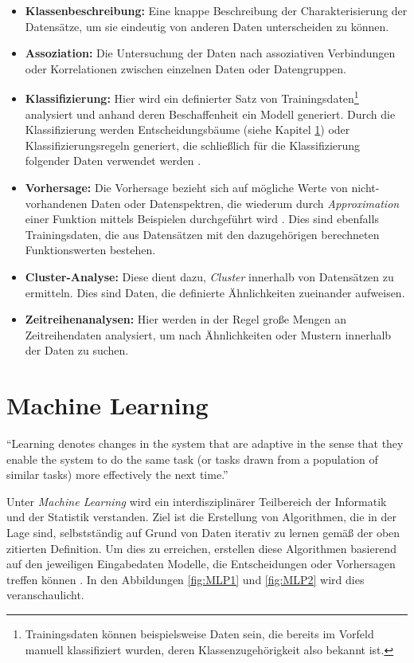\begin{itemize}
		\item \textbf{Klassenbeschreibung:} Eine knappe Beschreibung der Charakterisierung der Datensätze, um sie eindeutig von anderen Daten unterscheiden zu können. 
		\item \textbf{Assoziation:} Die Untersuchung der Daten nach assoziativen Verbindungen oder Korrelationen zwischen einzelnen Daten oder Datengruppen.   
		\item \textbf{Klassifizierung:} Hier wird ein definierter Satz von Trainingsdaten\footnote{Trainingsdaten können beispielsweise Daten sein, die bereits im Vorfeld manuell klassifiziert wurden, deren Klassenzugehörigkeit also bekannt ist.} analysiert und anhand deren Beschaffenheit ein Modell generiert. Durch die Klassifizierung werden Entscheidungsbäume (siehe Kapitel \ref{section:machine learning}) oder Klassifizierungsregeln generiert, die schließlich für die Klassifizierung folgender Daten verwendet werden . 
		\item \textbf{Vorhersage:} Die Vorhersage bezieht sich auf mögliche Werte von nicht-vorhandenen Daten oder Datenspektren, die wiederum durch \textit{Approximation} einer Funktion mittels Beispielen durchgeführt wird . Dies sind ebenfalls Trainingsdaten, die aus Datensätzen mit den dazugehörigen berechneten Funktionswerten bestehen. 
		\item \textbf{Cluster-Analyse:} Diese dient dazu, \textit{Cluster} innerhalb von Datensätzen zu ermitteln. Dies sind Daten, die definierte Ähnlichkeiten zueinander aufweisen. 
		\item \textbf{Zeitreihenanalysen:} Hier werden in der Regel große Mengen an Zeitreihendaten analysiert, um nach Ähnlichkeiten oder Mustern innerhalb der Daten zu suchen.  
		
\end{itemize}	

\newpage


\section{Machine Learning}
\label{section:machine learning}

\enquote{Learning denotes changes in the system that are adaptive in the sense that they enable the system to do the same task (or tasks drawn from a population of similar tasks) more effectively the next time.} 

Unter \textit{Machine Learning} wird ein interdisziplinärer Teilbereich der Informatik und der Statistik verstanden. Ziel ist die Erstellung von Algorithmen, die in der Lage sind, selbstständig auf Grund von Daten iterativ zu lernen gemäß der oben zitierten Definition. Um dies zu erreichen, erstellen diese Algorithmen basierend auf den jeweiligen Eingabedaten Modelle, die Entscheidungen oder Vorhersagen treffen können . In den Abbildungen \ref{fig:MLP1} und \ref{fig:MLP2} wird dies veranschaulicht. 


